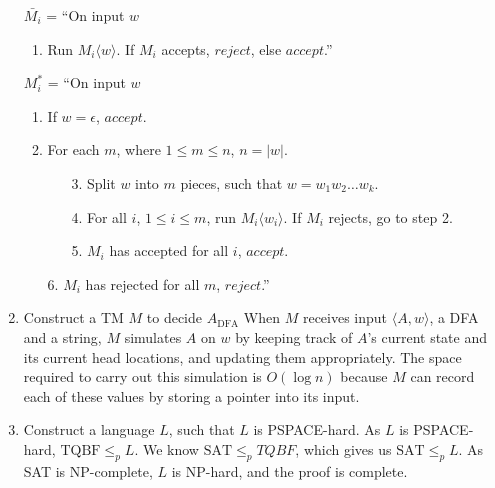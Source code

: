 \documentclass[11pt]{article}
\begin{document}
\begin{enumerate}[8.1]
    $\bar{M_i}$ = ``On input $w$
    \begin{enumerate}[label=\arabic*.]
      \item Run $M_i\langle w \rangle$. If $M_i$ accepts, $reject$, else $accept$.'' \\
    \end{enumerate}
    $M_i^*$ = ``On input $w$
    \begin{enumerate}[label=\arabic*.]
      \item If $w = \epsilon$, $accept$.
      \item For each $m$, where $1 \leq m \leq n$, $n = |w|$.
      \begin{enumerate}[label=\arabic*.]
        \item[3.] Split $w$ into $m$ pieces, such that $w = w_1w_2 \hdots w_k$.
        \item[4.] For all $i$, $1 \leq i \leq m$, run $M_i\langle w_i \rangle$. If $M_i$ rejects, go to step 2.
        \item[5.] $M_i$ has accepted for all $i$, $accept$.
      \end{enumerate}
      \item[6.] $M_i$ has rejected for all $m$, $reject$.'' \\
    \end{enumerate}
  \item Construct a TM $M$ to decide $A_\text{DFA}$ When $M$ receives input $\langle A, w \rangle$, a DFA and a string, $M$ simulates $A$ on $w$ by keeping track of $A$'s current state and its current head locations, and updating them appropriately. The space required to carry out this simulation is $O(\log{n})$ because $M$ can record each of these values by storing a pointer into its input.
  \item Construct a language $L$, such that $L$ is PSPACE-hard. As $L$ is PSPACE-hard, $\text{TQBF} \leq_p L$. We know $\text{SAT} \leq_p TQBF$, which gives us $\text{SAT} \leq_p L$. As SAT is NP-complete, $L$ is NP-hard, and the proof is complete.
\end{enumerate}
\end{document}
